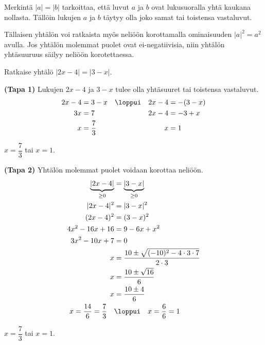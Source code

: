 Merkintä $|a|=|b|$ tarkoittaa, että luvut $a$ ja $b$ ovat lukusuoralla yhtä kaukana nollasta. Tällöin lukujen $a$ ja $b$ täytyy olla joko samat tai toistensa vastaluvut.


Tällaisen yhtälön voi ratkaista myös neliöön korottamalla ominaisuuden $|a|^2=a^2$ avulla. Jos yhtälön molemmat puolet ovat ei-negatiivisia, niin yhtälön yhtäsuuruus säilyy neliöön korotettaessa.


\begin{esimerkki}
	Ratkaise yhtälö $|2x-4|=|3-x|$.
	\begin{esimratk}
		\textbf{(Tapa 1)} Lukujen $2x-4$ ja $3-x$ tulee olla yhtäsuuret tai toistensa vastaluvut.
		\begin{align*}
			2x-4 & =3-x & &\loppui & 2x-4 & =-(3-x) \\
			3x & =7 && & 2x-4 & =-3+x \\
			x & =\frac{7}{3} && & x & =1
		\end{align*}
	\end{esimratk}
	\begin{esimvast}
		$x=\dfrac{7}{3}$ tai $x=1$.
	\end{esimvast}
	\begin{esimratk}
		\textbf{(Tapa 2)} Yhtälön molemmat puolet voidaan korottaa neliöön.
		\begin{align*}
			\underbrace{|2x-4|}_{\geq0} &= \underbrace{|3-x|}_{\geq0}    \\
			|2x-4|^2 &= |3-x|^2   \\
			(2x-4)^2 &= (3-x)^2   \\
			4x^2-16x+16 &= 9 -6x + x^2   \\
			3x^2-10x+7 &= 0   \\
			x &= \frac{10\pm\sqrt{(-10)^2-4\cdot 3\cdot 7}}{2\cdot 3}   \\
			x &= \frac{10\pm\sqrt{16}}{6}   \\		
			x &= \frac{10\pm4}{6}     \\
			x=\frac{14}{6}=\frac{7}{3} \quad  &\loppui \quad x=\frac{6}{6}=1 \\
		\end{align*}
	\end{esimratk}
	\begin{esimvast}
		$x=\dfrac{7}{3}$ tai $x=1$.
	\end{esimvast}
\end{esimerkki}

